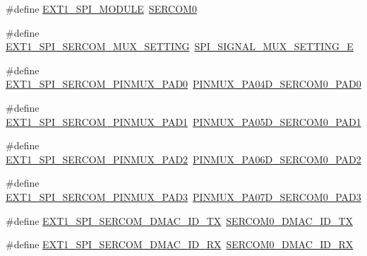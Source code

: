 \begin{DoxyCompactItemize}
\item 
\#define \mbox{\hyperlink{group__samd21__xplained__pro__features__group_gaa2643abcb5f9bf242d4854055a250370}{E\+X\+T1\+\_\+\+S\+P\+I\+\_\+\+M\+O\+D\+U\+LE}}~\mbox{\hyperlink{group___s_a_m_d21_j18_a__base_gae5473788457bad0e69ad9d7f22ed404f}{S\+E\+R\+C\+O\+M0}}
\item 
\#define \mbox{\hyperlink{group__samd21__xplained__pro__features__group_ga8063a4c2e063318656a5441c80f53c0c}{E\+X\+T1\+\_\+\+S\+P\+I\+\_\+\+S\+E\+R\+C\+O\+M\+\_\+\+M\+U\+X\+\_\+\+S\+E\+T\+T\+I\+NG}}~\mbox{\hyperlink{group__asfdoc__sam0__sercom__spi__group_gga420e19efe4a923eb9ab6dc619a23c370a7234b3f4e0aa7fe723cc85edabea9816}{S\+P\+I\+\_\+\+S\+I\+G\+N\+A\+L\+\_\+\+M\+U\+X\+\_\+\+S\+E\+T\+T\+I\+N\+G\+\_\+E}}
\item 
\#define \mbox{\hyperlink{group__samd21__xplained__pro__features__group_gaf15f22ea20148abf9d81973b73a76db6}{E\+X\+T1\+\_\+\+S\+P\+I\+\_\+\+S\+E\+R\+C\+O\+M\+\_\+\+P\+I\+N\+M\+U\+X\+\_\+\+P\+A\+D0}}~\mbox{\hyperlink{pio_2samd21j18a_8h_a713922b8d0cfc81d4825b7f86b0af387}{P\+I\+N\+M\+U\+X\+\_\+\+P\+A04\+D\+\_\+\+S\+E\+R\+C\+O\+M0\+\_\+\+P\+A\+D0}}
\item 
\#define \mbox{\hyperlink{group__samd21__xplained__pro__features__group_gabc7df5d710abfad71024f9aedc538990}{E\+X\+T1\+\_\+\+S\+P\+I\+\_\+\+S\+E\+R\+C\+O\+M\+\_\+\+P\+I\+N\+M\+U\+X\+\_\+\+P\+A\+D1}}~\mbox{\hyperlink{pio_2samd21j18a_8h_af8ccef59b8088e0ac4d3b60a243716b0}{P\+I\+N\+M\+U\+X\+\_\+\+P\+A05\+D\+\_\+\+S\+E\+R\+C\+O\+M0\+\_\+\+P\+A\+D1}}
\item 
\#define \mbox{\hyperlink{group__samd21__xplained__pro__features__group_ga6e40d3a1db63f7144c61706f13fd0164}{E\+X\+T1\+\_\+\+S\+P\+I\+\_\+\+S\+E\+R\+C\+O\+M\+\_\+\+P\+I\+N\+M\+U\+X\+\_\+\+P\+A\+D2}}~\mbox{\hyperlink{pio_2samd21j18a_8h_aaee1db140cc139a595c34cc55d03f6b8}{P\+I\+N\+M\+U\+X\+\_\+\+P\+A06\+D\+\_\+\+S\+E\+R\+C\+O\+M0\+\_\+\+P\+A\+D2}}
\item 
\#define \mbox{\hyperlink{group__samd21__xplained__pro__features__group_ga6a6ce015c66176cb4e9497d5d11bc0f7}{E\+X\+T1\+\_\+\+S\+P\+I\+\_\+\+S\+E\+R\+C\+O\+M\+\_\+\+P\+I\+N\+M\+U\+X\+\_\+\+P\+A\+D3}}~\mbox{\hyperlink{pio_2samd21j18a_8h_acd0fbf9c178814bd35328744a3f6df97}{P\+I\+N\+M\+U\+X\+\_\+\+P\+A07\+D\+\_\+\+S\+E\+R\+C\+O\+M0\+\_\+\+P\+A\+D3}}
\item 
\#define \mbox{\hyperlink{group__samd21__xplained__pro__features__group_ga8ae9ef7da196c166c214e5ae7fae0f08}{E\+X\+T1\+\_\+\+S\+P\+I\+\_\+\+S\+E\+R\+C\+O\+M\+\_\+\+D\+M\+A\+C\+\_\+\+I\+D\+\_\+\+TX}}~\mbox{\hyperlink{sercom0_8h_a365bf9ad932c1ae4fec249bb03a5e886}{S\+E\+R\+C\+O\+M0\+\_\+\+D\+M\+A\+C\+\_\+\+I\+D\+\_\+\+TX}}
\item 
\#define \mbox{\hyperlink{group__samd21__xplained__pro__features__group_ga6bb390a4ffd62a13afbca383227b128f}{E\+X\+T1\+\_\+\+S\+P\+I\+\_\+\+S\+E\+R\+C\+O\+M\+\_\+\+D\+M\+A\+C\+\_\+\+I\+D\+\_\+\+RX}}~\mbox{\hyperlink{sercom0_8h_ab5613175d987b32d775857976f6ab457}{S\+E\+R\+C\+O\+M0\+\_\+\+D\+M\+A\+C\+\_\+\+I\+D\+\_\+\+RX}}
\end{DoxyCompactItemize}
